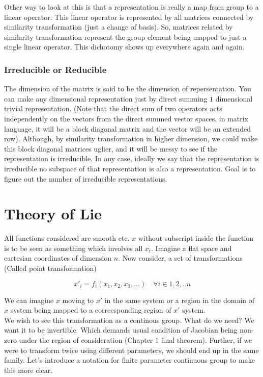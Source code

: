 \documentclass{report}
\begin{document}
\noindent Other way to look at this is that a representation is really a map from group to a linear operator. This linear operator is represented by all matrices connected by similarity transformation (just a change of basis). So, matrices related by similarity transformation represent the group element being mapped to just a single linear operator. This dichotomy shows up everywhere again and again.

\subsection{Irreducible or Reducible}

The dimension of the matrix is said to be the dimension of repersentation. You can make any dimensional representation just by direct summing $1$ dimensional trivial representation. (Note that the direct sum of two operators acts independently on the vectors from the direct summed vector spaces, in matrix language, it will be a block diagonal matrix and the vector will be an extended row). Although, by similarity transformation in higher dimension, we could make this block diagonal matrices uglier, and it will be messy to see if the representation is irreducible. In any case, ideally we say that the representation is irreducible no subspace of that representation is also a representation. Goal is to figure out the number of irreducible representations.

\chapter{Theory of Lie}

All functions considered are smooth etc. $x$ without subscript inside the function is to be seen as something which involves all $x_i$. Imagine a flat space and cartesian coordinates of dimension $n$. Now consider, a set of transformations (Called point transformation)

$$x'_i = f_i(x_1, x_2, x_3, ...) \quad \forall i \in {1,2,..n}$$

\noindent We can imagine $x$ moving to $x'$ in the same system or a region in the domain of $x$ system being mapped to a correesponding region of $x'$ system.\\

\noindent We wish to see this transformation as a continous group. What do we need? We want it to be invertible. Which demands usual condition of Jacobian being non-zero under the region of consideration (Chapter 1 final theorem). Further, if we were to transform twice using different parameters, we should end up in the same family. Let's introduce a notation for finite parameter continuous group to make this more clear. \\
\end{document}
